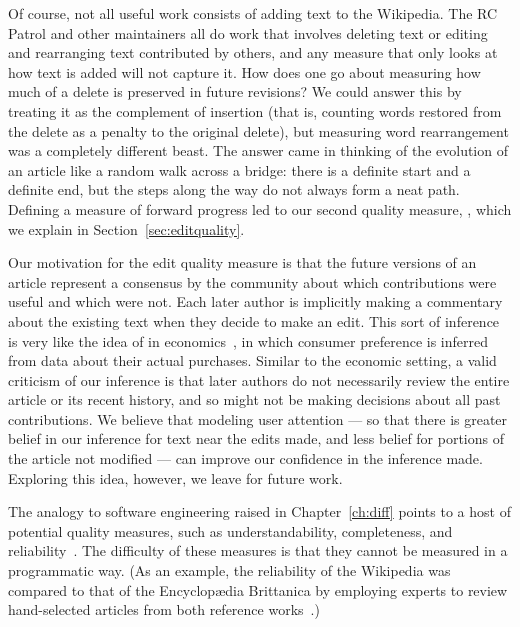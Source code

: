 Of course, not all useful work consists of adding text to the Wikipedia.
The RC Patrol and other maintainers all do work that involves
deleting text or editing and rearranging text contributed by others,
and any measure that only looks at how text is added will not capture it.
How does one go about measuring how much of a delete is preserved
in future revisions?
We could answer this by treating it as the complement of insertion
(that is, counting words restored from the delete as a
penalty to the original delete), but measuring word rearrangement
was a completely different beast.
The answer came in thinking of the evolution of an article
like a random walk across a bridge: there is a definite start and a
definite end, but the steps along the way do not always form a neat path.
Defining a measure of forward progress led to our second
quality measure, , which we explain in
Section~\ref{sec:editquality}.

Our motivation for the edit quality measure is that the future
versions of an article represent a consensus by the community about
which contributions were useful and which were not.
Each later author is implicitly making a commentary about the
existing text when they decide to make an edit.
This sort of inference is very like the idea of
 in economics~\cite{Samuelson1938,Varian2006},
in which consumer preference is inferred from data about their
actual purchases.
Similar to the economic setting, a valid criticism of our inference
is that later authors do not necessarily review the entire article
or its recent history, and so might not be making decisions about
all past contributions.
We believe that modeling user attention --- so that there is greater
belief in our inference for text near the edits made, and less belief
for portions of the article not modified ---
can improve our confidence in the inference made.
Exploring this idea, however, we leave for future work.

The analogy to software engineering raised in Chapter~\ref{ch:diff}
points to a host of potential quality measures, such as
understandability, completeness, and reliability~\cite{wiki:SoftwareQuality}.
The difficulty of these measures is that they cannot be measured
in a programmatic way.
(As an example, the reliability of the Wikipedia was compared to that
of the Encyclop{\ae}dia Brittanica by employing experts to review
hand-selected articles from both reference works~\cite{Giles2005}.)

